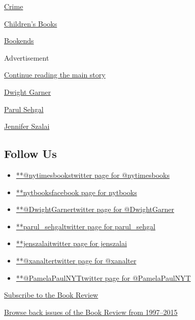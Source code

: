 \href{https://www.nytimes3xbfgragh.onion/column/crime}{Crime}

\href{https://www.nytimes3xbfgragh.onion/column/childrens-books}{Children's
Books}

\href{https://www.nytimes3xbfgragh.onion/column/bookends}{Bookends}

Advertisement

\protect\hyperlink{after-mktg}{Continue reading the main story}

\href{https://www.nytimes3xbfgragh.onion/by/dwight-garner}{Dwight
Garner}

\href{https://www.nytimes3xbfgragh.onion/by/parul-sehgal}{Parul Sehgal}

\href{https://www.nytimes3xbfgragh.onion/by/jennifer-szalai}{Jennifer
Szalai}

\hypertarget{follow-us}{%
\subsection{Follow Us}\label{follow-us}}

\begin{itemize}
\tightlist
\item
  \href{https://twitter.com/nytimesbooks}{**@nytimesbookstwitter page
  for @nytimesbooks}
\item
  \href{https://www.facebookcorewwwi.onion/nytbooks}{**nytbooksfacebook
  page for nytbooks}
\item
  \href{https://twitter.com/DwightGarner}{**@DwightGarnertwitter page
  for @DwightGarner}
\item
  \href{https://twitter.com/parul_sehgal}{**parul\_sehgaltwitter page
  for parul\_sehgal}
\item
  \href{https://twitter.com/jenszalai}{**jenszalaitwitter page for
  jenszalai}
\item
  \href{https://twitter.com/xanalter}{**@xanaltertwitter page for
  @xanalter}
\item
  \href{https://twitter.com/PamelaPaulNYT}{**@PamelaPaulNYTtwitter page
  for @PamelaPaulNYT}
\end{itemize}

\href{https://homedelivery.nytimes3xbfgragh.onion/HDS/BookReviewHome.do?mode=BookReviewHome\&ref=review}{Subscribe
to the Book Review}

\href{https://www.nytimes3xbfgragh.onion/2014/07/29/books/review/the-new-york-times-book-review-back-issues.html}{Browse
back issues of the Book Review from 1997--2015}

